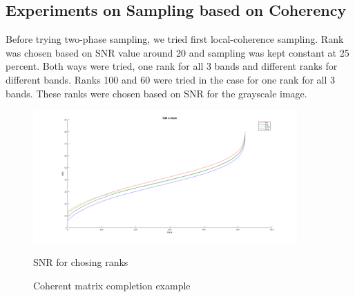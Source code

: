 \documentclass{article}
\begin{document}
\subsection{Experiments on Sampling based on Coherency}
Before trying two-phase sampling, we tried first local-coherence sampling. Rank was chosen based on SNR value around 20 and sampling was kept constant at 25 percent. Both ways were tried, one rank for all 3 bands and different ranks for different bands. Ranks 100 and 60 were tried in the case for one rank for all 3 bands. These ranks were chosen based on SNR for the grayscale image.
\begin{figure}[ht]
 \centering  
 \includegraphics[width=0.9\textwidth]{Figures/SNR.png}
 \label{fig:1}
 \caption{SNR for chosing ranks}
\end{figure} 
\begin{figure}[ht]
 \centering  
 \hfill
 \caption{Coherent matrix completion example}
\end{figure} 
\end{document}
